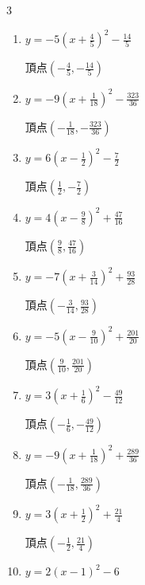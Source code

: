 \begin{multicols}{3}
\begin{enumerate}
        $\displaystyle 頂点\left( 4 , 9 \right)$

  \item $\displaystyle y=-5\left( x+\frac{4}{5}\right)^{2}-\frac{14}{5}$

        $\displaystyle 頂点\left( -\frac{4}{5} , -\frac{14}{5} \right)$

  \item $\displaystyle y=-9\left( x+\frac{1}{18}\right)^{2}-\frac{323}{36}$

        $\displaystyle 頂点\left( -\frac{1}{18} , -\frac{323}{36} \right)$

  \item $\displaystyle y=6\left( x-\frac{1}{2}\right)^{2}-\frac{7}{2}$

        $\displaystyle 頂点\left( \frac{1}{2} , -\frac{7}{2} \right)$

  \item $\displaystyle y=4\left( x-\frac{9}{8}\right)^{2}+\frac{47}{16}$

        $\displaystyle 頂点\left( \frac{9}{8} , \frac{47}{16} \right)$

\columnbreak %

  \item $\displaystyle y=-7\left( x+\frac{3}{14}\right)^{2}+\frac{93}{28}$

        $\displaystyle 頂点\left( -\frac{3}{14} , \frac{93}{28} \right)$

  \item $\displaystyle y=-5\left( x-\frac{9}{10}\right)^{2}+\frac{201}{20}$

        $\displaystyle 頂点\left( \frac{9}{10} , \frac{201}{20} \right)$

  \item $\displaystyle y=3\left( x+\frac{1}{6}\right)^{2}-\frac{49}{12}$

        $\displaystyle 頂点\left( -\frac{1}{6} , -\frac{49}{12} \right)$

  \item $\displaystyle y=-9\left( x+\frac{1}{18}\right)^{2}+\frac{289}{36}$

        $\displaystyle 頂点\left( -\frac{1}{18} , \frac{289}{36} \right)$

  \item $\displaystyle y=3\left( x+\frac{1}{2}\right)^{2}+\frac{21}{4}$

        $\displaystyle 頂点\left( -\frac{1}{2} , \frac{21}{4} \right)$

  \item $\displaystyle y=2\left( x-1\right)^{2}-6$


\end{enumerate}
\end{multicols}
